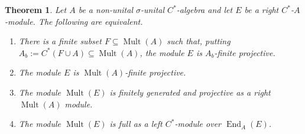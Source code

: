 \documentclass[pdftex]{sigma}
\numberwithin{equation}{section}
\newtheorem{thm}{Theorem}[section]
\DeclareMathOperator{\End}{End} %
\DeclareMathOperator{\Mult}{Mult} %
\begin{document}
\begin{thm} \label{thm:equiv-one}
Let $A$ be a non-unital $\sigma$-unital $C^*$-algebra and let $E$ be a right $C^*$-$A$-module. The following are equivalent.
\begin{enumerate}\itemsep=0pt
\item[$1.$] %
There is a finite subset $F \subseteq \Mult(A)$ such that, putting
 $A_b := C^*(F \cup A) \subseteq \Mult(A)$, the module $E$ is $A_b$-finite
 projective.
\item[$2.$] %
The module $E$ is $\Mult(A)$-finite projective.
\item[$3.$] %
The module $\Mult(E)$ is finitely generated and projective as a right $\Mult(A)$ module.
\item[$4.$] %
The module $\Mult(E)$ is full as a left $C^*$-module over $\End_A(E)$.
\end{enumerate}
\end{thm}
\end{document}
